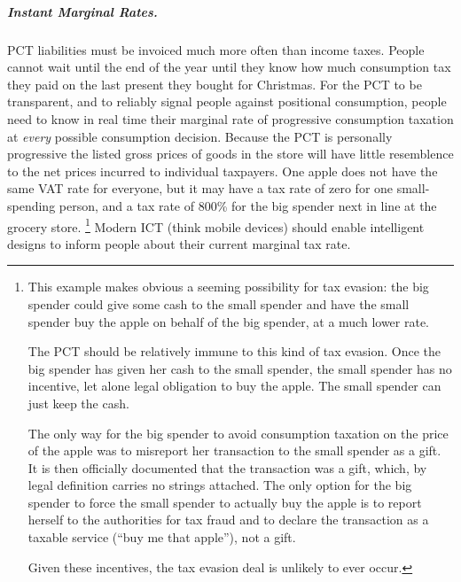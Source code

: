 \subparagraph{Instant Marginal Rates.}
PCT liabilities must be invoiced much more often than income taxes.
People cannot wait until the end of the year until they know how much consumption tax they paid on the last present they bought for Christmas.
For the PCT to be transparent, and to reliably signal people against positional consumption, people need to know in real time their marginal rate of progressive consumption taxation at \emph{every} possible consumption decision.
Because the PCT is personally progressive the listed gross prices of goods in the store will have little resemblence to the net prices incurred to individual taxpayers.
One apple does not have the same VAT rate for everyone, but it may have a tax rate of zero for one small-spending person, and a tax rate of 800\% for the big spender next in line at the grocery store.
\footnote{
	This example makes obvious a seeming possibility for tax evasion:
	the big spender could give some cash to the small spender and have the small spender buy the apple on behalf of the big spender, at a much lower rate.

	The PCT should be relatively immune to this kind of tax evasion.
	Once the big spender has given her cash to the small spender, the small spender has no incentive, let alone legal obligation to buy the apple.
	The small spender can just keep the cash.

	The only way for the big spender to avoid consumption taxation on the price of the apple was to misreport her transaction to the small spender as a gift.
	It is then officially documented that the transaction was a gift, which, by legal definition carries no strings attached.
	The only option for the big spender to force the small spender to actually buy the apple is to report herself to the authorities for tax fraud and to declare the transaction as a taxable service (``buy me that apple''), not a gift.

	Given these incentives, the tax evasion deal is unlikely to ever occur.
}
Modern ICT (think mobile devices) should enable intelligent designs to inform people about their current marginal tax rate.

